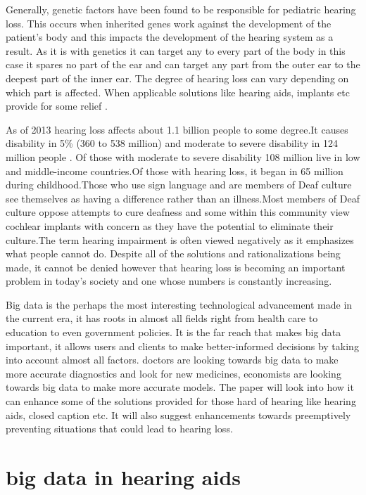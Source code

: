 \documentclass[sigconf]{acmart}
\begin{document}
Generally, genetic factors have been found to be responsible for pediatric hearing loss. This occurs when inherited genes work against the development of the patient's body and this impacts the development of the hearing system as a result. As it is with genetics it can target any to every part of the body in this case it spares no part of the ear and can target any part from the outer ear to the deepest part of the inner ear. The degree of hearing loss can vary depending on which part is affected. When applicable solutions like hearing aids, implants etc provide for some relief \cite{Wikipedia2017}.

As of 2013 hearing loss affects about 1.1 billion people to some degree\cite{Wikipedia2017}.It causes disability in 5\% (360 to 538 million) and moderate to severe disability in 124 million people \cite{Wikipedia2017} . Of those with moderate to severe disability 108 million live in low and middle-income countries.Of those with hearing loss, it began in 65 million during childhood.Those who use sign language and are members of Deaf culture see themselves as having a difference rather than an illness.Most members of Deaf culture oppose attempts to cure deafness and some within this community view cochlear implants with concern as they have the potential to eliminate their culture.The term hearing impairment is often viewed negatively as it emphasizes what people cannot do. Despite all of the solutions and rationalizations being made, it cannot be denied however that hearing loss is becoming an important problem in today's society and one whose numbers is constantly increasing\cite{Wikipedia2017}.

Big data is the perhaps the most interesting technological advancement made in the current era, it has roots in almost all fields right from health care to education to even government policies. It is the far reach that makes big data important, it allows users and clients to make better-informed decisions by taking into account almost all factors. doctors are looking towards big data to make more accurate diagnostics and look for new medicines, economists are looking towards big data to make more accurate models. The paper will look into how it can enhance some of the solutions provided for those hard of hearing like hearing aids, closed caption etc. It will also suggest enhancements towards preemptively preventing situations that could lead to hearing loss\cite{Wikipedia2017}.

\section{big data in hearing aids}
\end{document}
